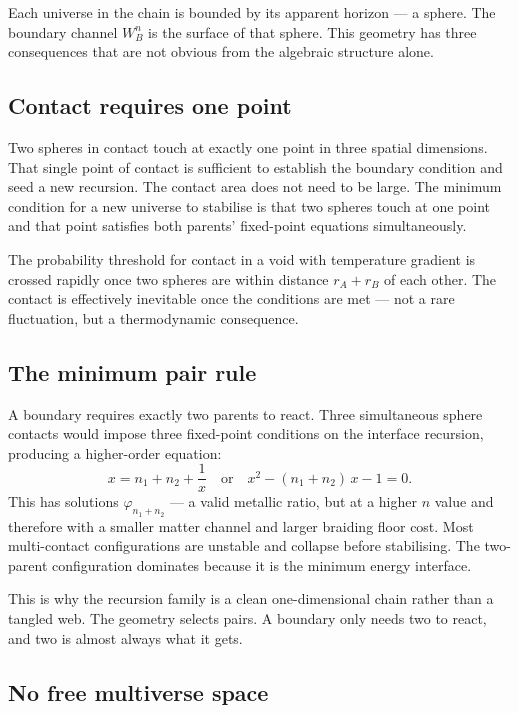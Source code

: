 \documentclass[prd,twocolumn,preprintnumbers,amsmath,amssymb]{revtex4-2}
\begin{document}
Each universe in the chain is bounded by its apparent horizon ---
a sphere. The boundary channel $W_B^n$ is the surface of that sphere.
This geometry has three consequences that are not obvious from the
algebraic structure alone.

\subsection{Contact requires one point}

Two spheres in contact touch at exactly one point in three spatial
dimensions. That single point of contact is sufficient to establish
the boundary condition and seed a new recursion. The contact area
does not need to be large. The minimum condition for a new universe
to stabilise is that two spheres touch at one point and that point
satisfies both parents' fixed-point equations simultaneously.

The probability threshold for contact in a void with temperature
gradient is crossed rapidly once two spheres are within distance
$r_A + r_B$ of each other. The contact is effectively inevitable
once the conditions are met --- not a rare fluctuation, but a
thermodynamic consequence.

\subsection{The minimum pair rule}

A boundary requires exactly two parents to react. Three simultaneous
sphere contacts would impose three fixed-point conditions on the
interface recursion, producing a higher-order equation:
\begin{equation}
  x = n_1 + n_2 + \frac{1}{x}
  \quad \text{or} \quad
  x^2 - (n_1 + n_2)\,x - 1 = 0.
\end{equation}
This has solutions $\varphi_{n_1+n_2}$ --- a valid metallic ratio,
but at a higher $n$ value and therefore with a smaller matter channel
and larger braiding floor cost. Most multi-contact configurations are
unstable and collapse before stabilising. The two-parent configuration
dominates because it is the minimum energy interface.

This is why the recursion family is a clean one-dimensional chain
rather than a tangled web. The geometry selects pairs. A boundary
only needs two to react, and two is almost always what it gets.

\subsection{No free multiverse space}
\end{document}
